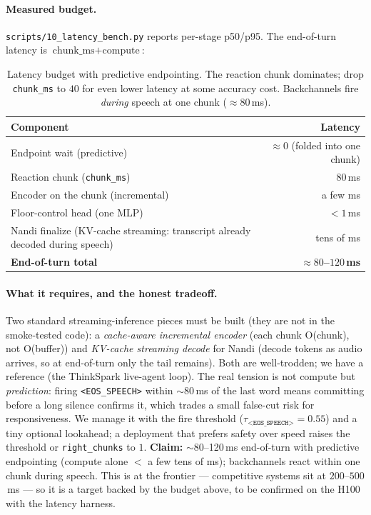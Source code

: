 \documentclass[11pt]{article}
\newcommand{\code}[1]{\texttt{#1}}
\newcommand{\flag}[1]{\texttt{<#1>}}
\begin{document}
\paragraph{Measured budget.} \code{scripts/10\_latency\_bench.py} reports per-stage p50/p95.
The end-of-turn latency is $\text{chunk\_ms} + \text{compute}$:
\begin{table}[h]\centering\small
\begin{tabular}{@{}lr@{}}
\toprule
Component & Latency\\
\midrule
Endpoint wait (predictive) & $\approx 0$ (folded into one chunk)\\
Reaction chunk (\code{chunk\_ms}) & $80$\,ms\\
Encoder on the chunk (incremental) & a few ms\\
Floor-control head (one MLP) & $<1$\,ms\\
Nandi finalize (KV-cache streaming: transcript already decoded during speech) & tens of ms\\
\midrule
\textbf{End-of-turn total} & \textbf{$\approx 80$--$120$\,ms}\\
\bottomrule
\end{tabular}
\caption{Latency budget with predictive endpointing. The reaction chunk dominates; drop
\code{chunk\_ms} to $40$ for even lower latency at some accuracy cost. Backchannels fire
\emph{during} speech at one chunk ($\approx$80\,ms).}
\end{table}

\paragraph{What it requires, and the honest tradeoff.} Two standard streaming-inference pieces
must be built (they are not in the smoke-tested code): a \emph{cache-aware incremental encoder}
(each chunk O(chunk), not O(buffer)) and \emph{KV-cache streaming decode} for Nandi (decode
tokens as audio arrives, so at end-of-turn only the tail remains). Both are well-trodden; we
have a reference (the ThinkSpark live-agent loop). The real tension is not compute but
\emph{prediction}: firing \flag{EOS\_SPEECH} within $\sim$80\,ms of the last word means
committing before a long silence confirms it, which trades a small false-cut risk for
responsiveness. We manage it with the fire threshold ($\tau_{\flag{EOS\_SPEECH}}=0.55$) and a
tiny optional lookahead; a deployment that prefers safety over speed raises the threshold or
\code{right\_chunks} to $1$. \textbf{Claim:} $\sim$80--120\,ms end-of-turn with predictive
endpointing (compute alone $<$ a few tens of ms); backchannels react within one chunk during
speech. This is at the frontier --- competitive systems sit at $200$--$500$\,ms --- so it is a
target backed by the budget above, to be confirmed on the H100 with the latency harness.
\end{document}
